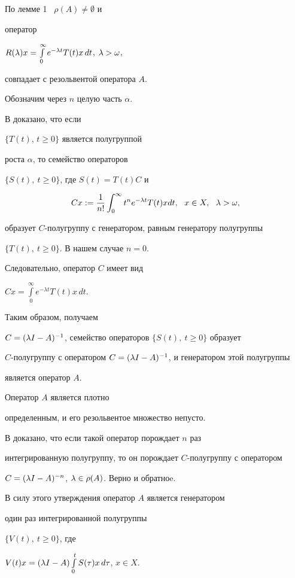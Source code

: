 \begin{pf}


По лемме 1 \ $\rho(A)\ne\emptyset$ и


оператор


$R(\lambda)x=\int\limits^{\infty}_{0}e^{-\lambda t}T(t)x\,dt$, $\lambda>\omega$,


совпадает с резольвентой оператора $A$.


Обозначим через $n$ целую часть $\alpha$.


В \cite{Miyadera} доказано, что если\linebreak


$\{T(t)$, $t\geq0\}$ является полугруппой


роста $\alpha$, то семейство операторов 


$\{S(t),\ t\geq 0\}$, где $S(t)=T(t)C$ и 


\begin{equation}\label{4}


Cx:=\frac{1}{n!} \int_0^\infty t^n e^{- \lambda t} T(t)xdt,


\ \ x \in X ,\ \ \l>\omega,


\end{equation}


образует $C$-полугруппу с генератором, равным генератору полугруппы


$\{T(t),\ t\geq0\}$. В нашем случае $n=0$. 


Следовательно, оператор $C$ имеет вид


$Cx=\int\limits_0^\infty e^{- \lambda t} T(t)x\,dt$. 


Таким образом, получаем


$C=(\lambda I-A)^{-1}$, семейство операторов $\{S(t),\ t\geq 0\}$ образует


$C$-полугруппу с оператором $C=(\lambda I -A)^{-1}$, и генератором этой полугруппы


является оператор $A$. 





Оператор $A$ является плотно 


определенным, и его резольвентое множество непусто.


В \cite{Tanaka} доказано, что если такой оператор порождает $n$ раз


интегрированную полугруппу, то он порождает $C$-полугруппу с оператором


$C=(\lambda I-A)^{-n}$, $\lambda\in \rho(A)$. Верно и обратноe.


В силу этого утверждения оператор $A$ является генератором 


один раз интегрированной полугруппы


$\{V(t),\ t\geq 0\}$, где


$V(t)x=(\lambda I-A)\int\limits^{t}_{0}S(\tau)x\,d\tau$, $x\in X$. 


\end{pf}





